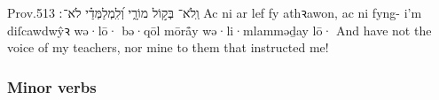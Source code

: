 \begin{example}{Prov.}{5}{13}{}{}
	\quoling
	{וְֽלֹא־ בְּק֣וֹל מוֹרָ֑י וְ֝לִֽמְלַמְּדַ֗י לֹא־ ׃}
	{Ac ni  ar lef fy athꝛawon, ac ni  fyng- i’m diſcawdwŷꝛ}
	{wə·lō· bə·qōl mōrå̄y wə·li·mlamməḏay lō· }
	{And have not  the voice of my teachers, nor  mine  to them that instructed me!}
\end{example}



\subsubsection{Minor verbs}

